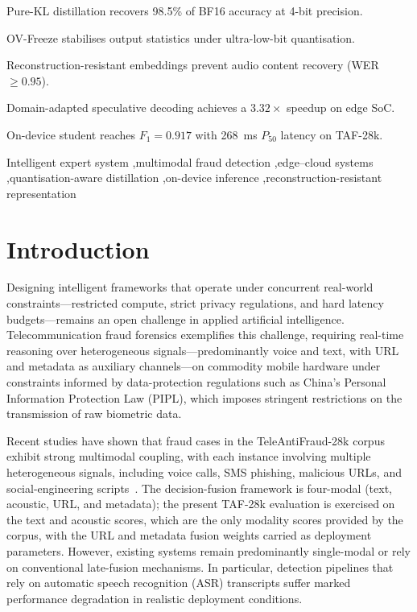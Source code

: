 \documentclass[a4paper,fleqn]{cas-sc}
\begin{document}
\begin{highlights}
\item Pure-KL distillation recovers 98.5\% of BF16 accuracy at 4-bit precision.
\item OV-Freeze stabilises output statistics under ultra-low-bit quantisation.
\item Reconstruction-resistant embeddings prevent audio content recovery (WER $\ge 0.95$).
\item Domain-adapted speculative decoding achieves a $3.32\times$ speedup on edge SoC.
\item On-device student reaches $F_1=0.917$ with 268~ms $P_{50}$ latency on TAF-28k.
\end{highlights}

\begin{keywords}  
Intelligent expert system
\sep multimodal fraud detection
\sep edge--cloud systems 
\sep quantisation-aware distillation 
\sep on-device inference 
\sep reconstruction-resistant representation
\end{keywords}

\maketitle

\section{Introduction}

Designing intelligent frameworks that operate under concurrent real-world constraints---restricted compute, strict privacy regulations, and hard latency budgets---remains an open challenge in applied artificial intelligence. Telecommunication fraud forensics exemplifies this challenge, requiring real-time reasoning over heterogeneous signals---predominantly voice and text, with URL and metadata as auxiliary channels---on commodity mobile hardware under constraints informed by data-protection regulations such as China's Personal Information Protection Law (PIPL), which imposes stringent restrictions on the transmission of raw biometric data.

Recent studies have shown that fraud cases in the TeleAntiFraud-28k corpus exhibit strong multimodal coupling, with each instance involving multiple heterogeneous signals, including voice calls, SMS phishing, malicious URLs, and social-engineering scripts~\citep{1}. The decision-fusion framework is four-modal (text, acoustic, URL, and metadata); the present TAF-28k evaluation is exercised on the text and acoustic scores, which are the only modality scores provided by the corpus, with the URL and metadata fusion weights carried as deployment parameters. However, existing systems remain predominantly single-modal or rely on conventional late-fusion mechanisms. In particular, detection pipelines that rely on automatic speech recognition (ASR) transcripts suffer marked performance degradation in realistic deployment conditions.
\end{document}
